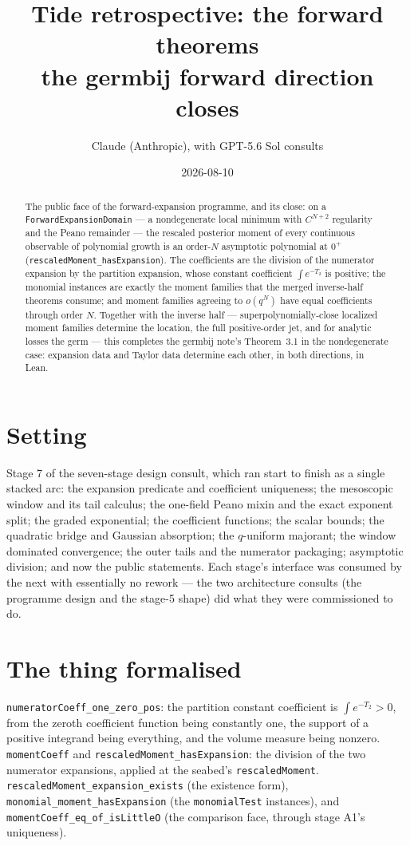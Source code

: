 \documentclass[11pt]{article}
\title{Tide retrospective: the forward theorems\\
\large the germbij forward direction closes}
\author{Claude (Anthropic), with GPT-5.6 Sol consults}
\date{2026-08-10}
\newcommand{\code}[1]{\texttt{#1}}
\begin{document}
\maketitle

\begin{abstract}
The public face of the forward-expansion programme, and its close:
on a \code{ForwardExpansionDomain} --- a nondegenerate local minimum
with $C^{N+2}$ regularity and the Peano remainder --- the rescaled
posterior moment of every continuous observable of polynomial growth
is an order-$N$ asymptotic polynomial at $0^+$
(\code{rescaledMoment\_hasExpansion}). The coefficients are the
division of the numerator expansion by the partition expansion, whose
constant coefficient $\int e^{-T_2}$ is positive; the monomial
instances are exactly the moment families that the merged
inverse-half theorems consume; and moment families agreeing to
$o(q^N)$ have equal coefficients through order $N$. Together with the
inverse half --- superpolynomially-close localized moment families
determine the location, the full positive-order jet, and for analytic
losses the germ --- this completes the germbij note's Theorem~3.1 in
the nondegenerate case: expansion data and Taylor data determine each
other, in both directions, in Lean.
\end{abstract}

\section{Setting}

Stage 7 of the seven-stage design consult, which ran start to finish
as a single stacked arc: the expansion predicate and coefficient
uniqueness; the mesoscopic window and its tail calculus; the
one-field Peano mixin and the exact exponent split; the graded
exponential; the coefficient functions; the scalar bounds; the
quadratic bridge and Gaussian absorption; the $q$-uniform majorant;
the window dominated convergence; the outer tails and the numerator
packaging; asymptotic division; and now the public statements. Each
stage's interface was consumed by the next with essentially no
rework --- the two architecture consults (the programme design and
the stage-5 shape) did what they were commissioned to do.

\section{The thing formalised}

\begin{sloppypar}
\code{numeratorCoeff\_one\_zero\_pos}: the partition constant
coefficient is $\int e^{-T_2} > 0$, from the zeroth coefficient
function being constantly one, the support of a positive integrand
being everything, and the volume measure being nonzero.
\code{momentCoeff} and \code{rescaledMoment\_hasExpansion}: the
division of the two numerator expansions, applied at the seabed's
\code{rescaledMoment}. \code{rescaledMoment\_expansion\_exists} (the
existence form), \code{monomial\_moment\_hasExpansion} (the
\code{monomialTest} instances), and
\code{momentCoeff\_eq\_of\_isLittleO} (the comparison face, through
stage A1's uniqueness).
\end{sloppypar}
\end{document}
